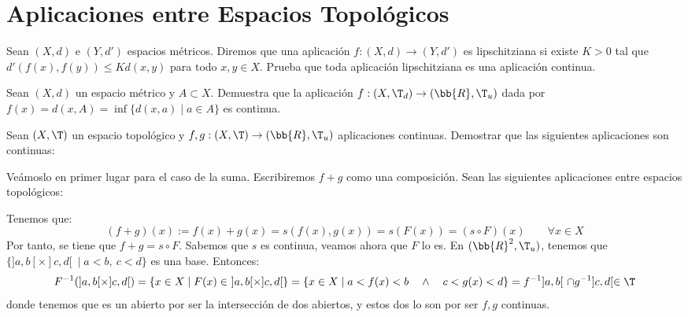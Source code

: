 \section{Aplicaciones entre Espacios Topológicos}

\begin{ejercicio}
    Sean $(X, d)$ e $(Y, d')$ espacios métricos. Diremos que una aplicación $f : (X, d) \to (Y, d')$ es lipschitziana si existe $K > 0$ tal que $d'(f(x), f(y)) \leq Kd(x, y)$ para todo $x, y \in X$. Prueba que toda aplicación lipschitziana es una aplicación continua.
\end{ejercicio}

\begin{ejercicio}
    Sean $(X, d)$ un espacio métrico y $A \subset X$. Demuestra que la aplicación $f : (X, \T_d) \to (\bb{R},\T_u)$ dada por $f(x) = d(x, A) = \inf\{d(x, a) \mid a \in A\}$ es continua.
\end{ejercicio}

\begin{ejercicio}
    Sean $(X, \T)$ un espacio topológico y $f, g:(X, \T) \to (\bb{R},\T_u)$ aplicaciones continuas. Demostrar que las siguientes aplicaciones son continuas:

    Veámoslo en primer lugar para el caso de la suma. Escribiremos $f+g$ como una composición. Sean las siguientes aplicaciones entre espacios topológicos:

    Tenemos que:
    \begin{equation*}
        (f+g)(x):=f(x)+g(x)=s(f(x),g(x))=s(F(x))=(s\circ F)(x) \qquad \forall  x\in X
    \end{equation*}
    Por tanto, se tiene que $f+g=s\circ F$. Sabemos que $s$ es continua, veamos ahora que $F$ lo es. En $(\bb{R}^2,\T_u)$, tenemos que $\{]a,b[\times ]c,d[~ \mid a<b,~ c<d\}$ es una base. Entonces:
    \begin{equation*}
        F^{-1}(]a,b[\times ]c,d[)
        = \left\{
        x\in X\mid F(x)\in~  ]a,b[\times]c,d[
        \right\}
        = \left\{
        x\in X\mid a<f(x)<b \quad \land \quad c<g(x)<d
        \right\}
        = f^{-1}]a,b[~ \cap g^{-1}]c,d[\in \T
    \end{equation*}
    donde tenemos que es un abierto por ser la intersección de dos abiertos, y estos dos lo son por ser $f,g$ continuas.
\end{ejercicio}


